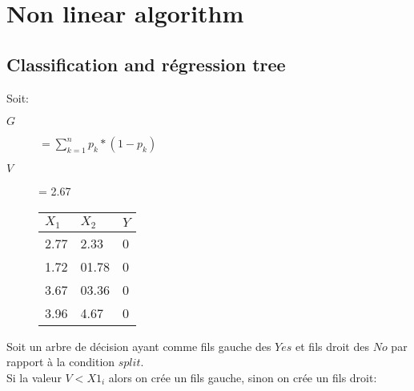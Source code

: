 \chapter{Non linear algorithm}
\section{Classification and régression tree}
Soit:\\
\begin{description}
\item[$G$] $ = \sum_{k=1}^n p_k * (1 - p_k)$
\item[$V$] = 2.67
\item[] \begin{tabular}{ll|l}
  \hline
  $ X_1 $ & $ X_2 $ &  $Y $\\
  \hline
  2.77 & 2.33 & 0\\
  1.72 & 01.78 & 0\\
  3.67 & 03.36 & 0\\
  3.96 & 4.67 & 0\\
  \hline
\end{tabular}
\end{description}

Soit un arbre de décision ayant comme fils gauche des $Yes$ et fils droit des $No$ par rapport à la condition $split$.\\
Si la valeur $V < X1_i$ alors on crée un fils gauche, sinon on crée un fils droit:\\


